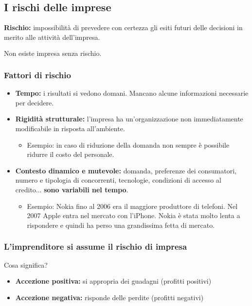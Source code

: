 \documentclass[../main.tex]{subfiles}
\begin{document}
\subsection{I rischi delle imprese}
		
\textbf{Rischio:} impossibilità di prevedere con certezza gli esiti futuri delle decisioni in merito alle attività dell'impresa.
	
Non esiste impresa senza rischio.

\subsubsection{Fattori di rischio}

\begin{itemize}
\item
\textbf{Tempo:} i risultati si vedono domani. Mancano alcune informazioni necessarie per decidere.

\item
\textbf{Rigidità strutturale:} l'impresa ha un'organizzazione non immediatamente modificabile in risposta all'ambiente.
	\begin{itemize}
	\item
	Esempio: in caso di riduzione della domanda non sempre è possibile ridurre il costo del personale.
	\end{itemize}

\item
\textbf{Contesto dinamico e mutevole:} domanda, preferenze dei consumatori, numero e tipologia di concorrenti, tecnologie, condizioni di accesso al credito... \textbf{sono variabili nel tempo}.

	\begin{itemize}
	\item
	Esempio: Nokia fino al 2006 era il maggiore produttore di telefoni. Nel 2007 Apple entra nel mercato con l'iPhone. Nokia è stata molto lenta a rispondere e quindi ha perso una grandissima fetta di mercato.
	\end{itemize}

\end{itemize}

\subsubsection{L'imprenditore si assume il rischio di impresa}
Cosa significa?

\begin{itemize}
\item
\textbf{Accezione positiva:} si appropria dei guadagni (profitti positivi)
\item
\textbf{Accezione negativa:} risponde delle perdite (profitti negativi)
\end{itemize}
\end{document}
